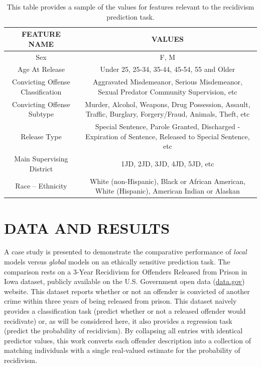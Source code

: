 \documentclass[conference]{IEEEtran}
\begin{document}
\begin{table}
\begin{center}
\begin{tabular}{ c | c }
 \hline
 \textbf{FEATURE NAME} & \textbf{VALUES} \\
 \hline
 Sex & F, M \\
  \hline
 Age At Release & Under 25, 25-34, 35-44, 45-54, 55 and Older \\  
  \hline
 Convicting Offense Classification & Aggravated Misdemeanor, Serious Misdemeanor, Sexual Predator Community Supervision, etc \\
  \hline
Convicting Offense Subtype & Murder, Alcohol, Weapons, Drug Possession, Assault, Traffic, Burglary, Forgery/Fraud, Animals, Theft, etc\\  
 \hline
Release Type & Special Sentence, Parole Granted, Discharged - Expiration of Sentence, Released to Special Sentence, etc \\  
 \hline
Main Supervising District & 1JD, 2JD, 3JD, 4JD, 5JD, etc\\  
 \hline
Race -- Ethnicity & White (non-Hispanic), Black or African American, White (Hispanic), American Indian or Alaskan\\
 \hline
\end{tabular}
\end{center}
\caption{This table provides a sample of the values for features relevant to the recidivism prediction task.}
\label{table:1}
\end{table}


\section{DATA AND RESULTS}
\label{sec:data}

A case study is presented to demonstrate the comparative performance of \textit{local} models versus \textit{global} models on an ethically sensitive prediction task. The comparison rests on a 3-Year Recidivism for Offenders Released from Prison in Iowa dataset, publicly available on the U.S. Government open data (\href{https://www.data.gov}{data.gov}) website. This dataset reports whether or not an offender is convicted of another crime within three years of being released from prison. This dataset naively provides a classification task (predict whether or not a released offender would recidivate) or, as will be considered here, it also provides a regression task (predict the probability of recidivism). By collapsing all entries with identical predictor values, this work converts each offender description into a collection of matching individuals with a single real-valued estimate for the probability of recidivism.
\end{document}
